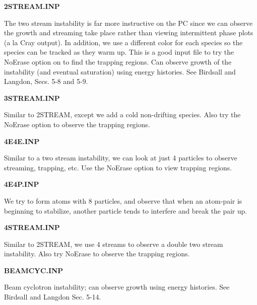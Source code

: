 \begin{section}
\begin{subsection}
\begin{subsubsection}
{\bf 2STREAM.INP}

      The two stream instability is far more instructive on the PC since we can
      observe the growth and streaming take place rather than viewing
      intermittent phase plots (a la Cray output).  In addition, we use a
      different color for each species so the species can be tracked as they
      warm up.  This is a good input file to try the NoErase option on to find
      the trapping regions.  Can observe growth of the instability (and
      eventual saturation) using energy histories.  See Birdsall and Langdon,
      Secs. 5-8 and 5-9.
\end{subsubsection}

\begin{subsubsection}
{\bf 3STREAM.INP}

      Similar to 2STREAM, except we add a cold non-drifting species.  Also try
      the NoErase option to observe the trapping regions.
\end{subsubsection}

\begin{subsubsection}
{\bf 4E4E.INP}

      Similar to a two stream instability, we can look at just 4 particles to
      observe streaming, trapping, etc.  Use the NoErase option to view
      trapping regions.
\end{subsubsection}

\begin{subsubsection}
{\bf 4E4P.INP}

      We try to form atoms with 8 particles, and observe that when an atom-pair
      is beginning to stabilize, another particle tends to interfere and break
      the pair up.
\end{subsubsection}

\begin{subsubsection}
{\bf 4STREAM.INP}

      Similar to 2STREAM, we use 4 streams to observe a double two stream
      instability.  Also try NoErase to observe the trapping regions.
\end{subsubsection}

\begin{subsubsection}
{\bf BEAMCYC.INP}

      Beam cyclotron instability; can observe growth using energy histories.
      See Birdsall and Langdon Sec. 5-14.
\end{subsubsection}


\end{subsection}
\end{section}
